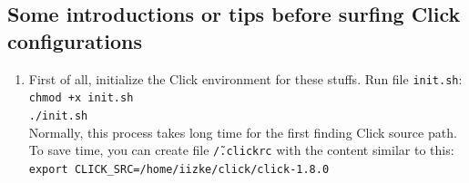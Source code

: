 \documentclass[a4paper]{article}
\begin{document}
    \subsection{Some introductions or tips before surfing Click configurations}
      \begin{enumerate}
      	\item 
      	  First of all, initialize the Click environment for these stuffs. Run file \texttt{init.sh}: \\
      	    \texttt{chmod +x init.sh\\
      	    ./init.sh}\\
      	  Normally, this process takes long time for the first finding Click source path. To save time, you can create file \texttt{\~/.clickrc} with the content similar to this:\\
            \texttt{export CLICK\_SRC=/home/iizke/click/click-1.8.0}
        

\end{enumerate}
\end{document}
